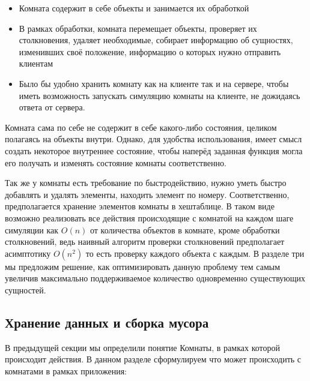 \documentclass[a4paper,14pt, openany]{book}
\begin{document}
\begin{itemize}
  \item Комната содержит в себе объекты и занимается их обработкой
  \item В рамках обработки, комната перемещает объекты, проверяет их столкновения, удаляет необходимые, собирает информацию об сущностях, изменивших своё положение, информацию о которых нужно отправить клиентам
  \item Было бы удобно хранить комнату как на клиенте так и на сервере, чтобы иметь возможность запускать симуляцию комнаты на клиенте, не дожидаясь ответа от сервера. 
\end{itemize}

Комната сама по себе не содержит в себе какого-либо состояния, целиком полагаясь на объекты внутри. Однако, для удобства использования, имеет смысл создать некоторое внутреннее состояние, чтобы наперёд заданная функция могла его получать и изменять состояние комнаты соответственно.

Так же у комнаты есть требование по быстродействию, нужно уметь быстро добавлять и удалять элементы, находить элемент по номеру. Соответственно, предполагается хранение элементов комнаты в хештаблице. В таком виде возможно реализовать все действия происходящие с комнатой на каждом шаге симуляции как $O(n) $ от количества объектов в комнате, кроме обработки столкновений, ведь наивный алгоритм проверки столкновений предполагает асимптотику $ O(n^2)$ то есть проверку каждого объекта с каждым. В разделе три мы предложим решение, как оптимизировать данную проблему тем самым увеличив максимально поддерживаемое количество одновременно существующих сущностей.

\subsection{Хранение данных и сборка мусора}

В предыдущей секции мы определили понятие Комнаты, в рамках которой происходит действия. В данном разделе сформулируем что может происходить с комнатами в рамках приложения:
\end{document}
